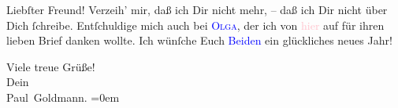 \pstart
           Liebſter Freund! Verzeih’ mir, daß ich Dir nicht mehr, – daß ich Dir nicht über Dich
               ſchreibe. Entſchuldige mich auch bei \textsc{\textcolor{blue}{Olga}{}\ledrightnote{\textcolor{blue}{Olga Schnitzler}}}, der ich von \textcolor{pink}{hier}{}\ledrightnote{{$\rightarrow$}\textcolor{pink}{Frankfurt am Main}} auf für
               ihren lieben Brief danken wollte. Ich wünſche Euch \textcolor{blue}{Beiden}{}\ledrightnote{{$\rightarrow$}\textcolor{blue}{Olga Schnitzler}} ein glückliches neues Jahr!\pend
           
\pstart
           Viele treue Grüße! {\\[\baselineskip]}Dein {\\[\baselineskip]}\spacefill\mbox{Paul Goldmann.}\pend
           \leftskip=0em{}\endnumbering{}
\begin{anhang}
\end{anhang}
      